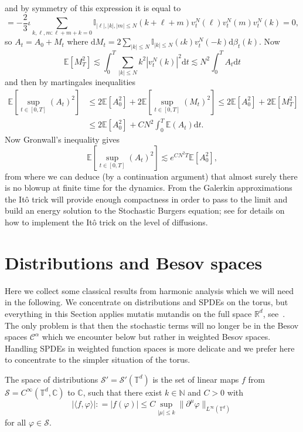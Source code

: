 \documentclass[a4paper,11pt]{article}
\newcommand{\mathd}{\mathrm{d}}
\newcommand{\CS}{\mathscr{S}}
\newcommand{\CC}{\mathscr{C}}
\begin{document}
and by symmetry of this expression it is equal to
\[ = - \frac{2}{3} \iota \sum_{k, \ell, m : \ell + m + k = 0} \mathbb{I}_{|
   \ell |, | k |, | m | \leqslant N}  (k + \ell + m) v^N_t (\ell) v^N_t (m)
   v^N_t (k) = 0, \]
so $A_t = A_0 + M_t$ where $\mathd M_t = 2 \sum_{| k | \leqslant N}
\mathbb{I}_{| k | \leqslant N} (\iota k) v^N_t (- k) \mathd \beta_t (k)$. Now
\[ \mathbb{E} [M_T^2] \lesssim \int_0^T \sum_{| k | \leqslant N} k^2 | v^N_t
   (k) |^2 \mathd t \lesssim N^2 \int_0^T A_t \mathd t \]
and then by martingales inequalities
\begin{align*}
   \mathbb{E} [\sup_{t \in [0, T]} (A_t)^2] & \leqslant 2\mathbb{E} [A_0^2] + 2\mathbb{E} [\sup_{t \in [0, T]} (M_t)^2] \leqslant 2\mathbb{E} [A_0^2]^{} + 2\mathbb{E} [M_T^2]^{} \\
    & \leqslant 2\mathbb{E} [A_0^2]^{} + CN^2 \int_0^T \mathbb{E} (A_t) \mathd t.
\end{align*}
Now Gronwall's inequality gives
\[ \mathbb{E} [\sup_{t \in [0, T]} (A_t)^2] \lesssim e^{CN^2 T} \mathbb{E}
   [A_0^2], \]
from where we can deduce (by a continuation argument) that almost surely there
is no blowup at finite time for the dynamics. From the Galerkin approximations
the It{\^o} trick will provide enough compactness in order to pass to the
limit and build an energy solution to the Stochastic Burgers equation; see \cite{Russo2001} for details on how to implement the It\^o trick on the level of diffusions.

\section{Distributions and Besov spaces}\label{sec:preliminaries}

Here we collect some classical results from harmonic analysis which we will
need in the following. We concentrate on distributions and SPDEs on the torus,
but everything in this Section applies mutatis mutandis on the full space
$\mathbb{R}^d$, see~{\cite{Gubinelli2012}}. The only problem is that then the
stochastic terms will no longer be in the Besov spaces $\CC^{\alpha}$ which we
encounter below but rather in weighted Besov spaces. Handling SPDEs in weighted function spaces is more delicate and we prefer here to concentrate to the simpler situation of the torus.

The space of distributions $\CS' = \CS' (\mathbb{T}^d)$ is the set of linear
maps $f$ from $\CS = C^{\infty} (\mathbb{T}^d, \mathbb{C})$ to
$\mathbb{C}$, such that there exist $k \in \mathbb{N}$ and $C > 0$ with
\[ | \langle f, \varphi \rangle | : = | f (\varphi) | \leqslant C \sup_{|
   {\mu} | \leqslant k} \| \partial^{{\mu}} \varphi \|_{L^{\infty}
   (\mathbb{T}^d)} \]
for all $\varphi \in \CS$.
\end{document}
